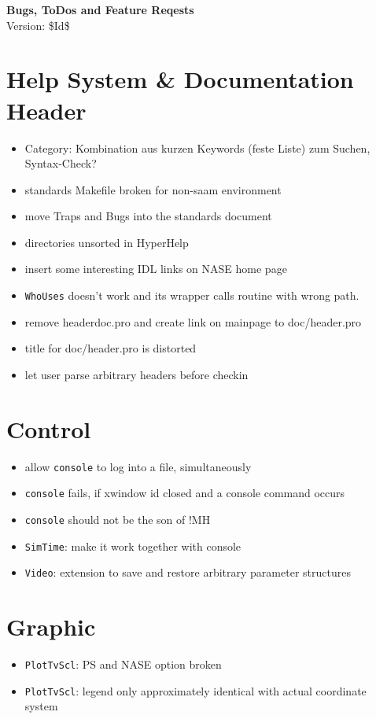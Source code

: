 \documentclass[12pt]{article}
\begin{document}
\begin{center}
{\Huge\textbf{Bugs, ToDos and Feature Reqests}}\\[2cm]
Version: \$Id$ $\$ 
\end{center}

\section{Help System \& Documentation Header} 

\begin{itemize}
\item Category: Kombination aus kurzen Keywords (feste Liste) zum Suchen, Syntax-Check?
\item standards Makefile broken for non-saam environment
\item move Traps and Bugs into the standards document
\item directories unsorted in HyperHelp
\item insert some interesting IDL links on NASE home page
\item \texttt{WhoUses} doesn't work and its wrapper calls routine with wrong path.
\item remove headerdoc.pro and create link on mainpage to doc/header.pro
\item title for doc/header.pro is distorted
\item let user parse arbitrary headers before checkin
\end{itemize}



\section{Control}
\begin{itemize}
\item allow \texttt{console} to log into a file, simultaneously
\item \texttt{console} fails, if xwindow id closed and a console command occurs
\item \texttt{console} should not be the son of !MH
\item \texttt{SimTime}: make it work together with console
\item \texttt{Video}: extension to save and restore arbitrary parameter structures
\end{itemize}


\section{Graphic}
\begin{itemize}
\item \texttt{PlotTvScl}: PS and NASE option broken
\item \texttt{PlotTvScl}: legend only approximately identical with actual coordinate system
\end{itemize}
\end{document}
